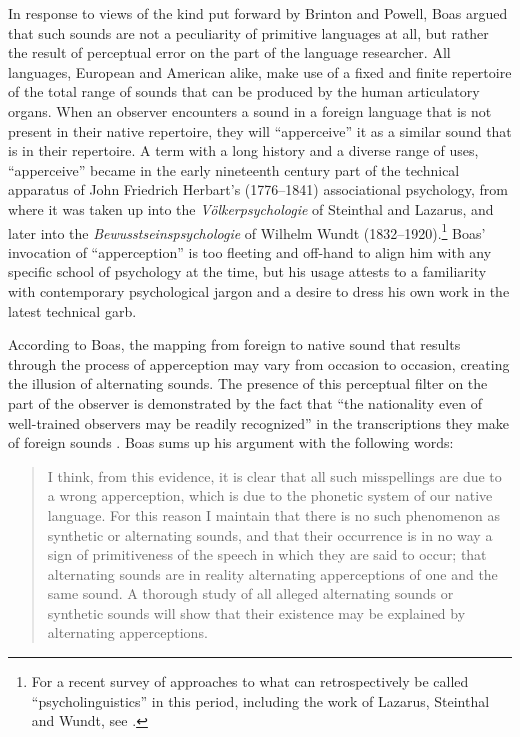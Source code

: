 \documentclass[output=paper]{langscibook}
\begin{document}
In response to views of the kind put forward by Brinton and Powell, Boas argued that such sounds are not a peculiarity of primitive languages at all, but rather the result of perceptual error on the part of the language researcher. All languages, European and American alike, make use of a fixed and finite repertoire of the total range of sounds that can be produced by the human articulatory organs. When an observer encounters a sound in a foreign language that is not present in their native repertoire, they will ``apperceive'' it as a similar sound that is in their repertoire. A term with a long history and a diverse range of uses, ``apperceive'' became in the early nineteenth century part of the technical apparatus of John Friedrich Herbart's (1776--1841) associational psychology, from where it was taken up into the \emph{Völkerpsychologie} of Steinthal and Lazarus, and later into the \emph{Bewusstseinspsychologie} of Wilhelm Wundt (1832--1920).\footnote{For a recent survey of approaches to what can retrospectively be called ``psycholinguistics'' in this period, including the work of Lazarus, Steinthal and Wundt, see \citet{Levelt2013}.} Boas' invocation of ``apperception'' is too fleeting and off-hand to align him with any specific school of psychology at the time, but his usage attests to a familiarity with contemporary psychological jargon and a desire to dress his own work in the latest technical garb.

According to Boas, the mapping from foreign to native sound that results through the process of apperception may vary from occasion to occasion, creating the illusion of alternating sounds. The presence of this perceptual filter on the part of the observer is demonstrated by the fact that ``the nationality even of well-trained observers may be readily recognized'' in the transcriptions they make of foreign sounds \citep[51]{Boas1889}. Boas sums up his argument with the following words:

\begin{quotation}
I think, from this evidence, it is clear that all such misspellings are due to a wrong apperception, which is due to the phonetic system of our native language. For this reason I maintain that there is no such phenomenon as synthetic or alternating sounds, and that their occurrence is in no way a sign of primitiveness of the speech in which they are said to occur; that alternating sounds are in reality alternating apperceptions of one and the same sound. A thorough study of all alleged alternating sounds or synthetic sounds will show that their existence may be explained by alternating apperceptions. \citep[52]{Boas1889}
\end{quotation}
\end{document}
